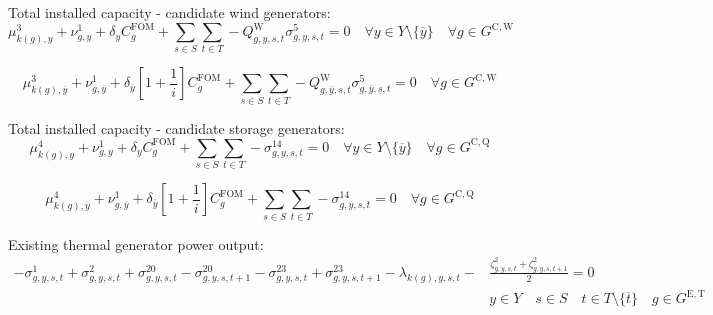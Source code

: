 \documentclass{article}
\newcommand{\sGeneratorsExistingThermal}{G^{\mathrm{E,T}}}
\newcommand{\sGeneratorsCandidateWind}{G^{\mathrm{C,W}}}
\newcommand{\sStorageCandidate}{G^{\mathrm{C,Q}}}
\newcommand{\sYears}{Y}
\newcommand{\sScenarios}{S}
\newcommand{\sIntervals}{T}
\newcommand{\iGenerator}{g}
\newcommand{\iYear}{y}
\newcommand{\iYearTerminal}{\overline{\iYear}}
\newcommand{\iScenario}{s}
\newcommand{\iInterval}{t}
\newcommand{\iIntervalTerminal}{\overline{\iInterval}}
\newcommand{\iZone}{z}
\newcommand{\cFixedOperationsMaintenanceCostGenerator}[1][\iGenerator]{C^{\mathrm{FOM}}_{#1}}
\newcommand{\cInterestRate}{i}
\newcommand{\cCapacityFactorWind}[1][\iGenerator,\iYear,\iScenario,\iInterval]{Q_{#1}^{\mathrm{W}}}
\newcommand{\cDiscountRate}[1][\iYear]{\delta_{#1}}
\newcommand{\dWindBuildLimit}[1][\iZone,\iYear]{\mu_{#1}^{3}}
\newcommand{\dStorageBuildLimit}[1][\iZone,\iYear]{\mu_{#1}^{4}}
\newcommand{\dTotalInstallCapacity}[1][\iGenerator,\iYear]{\nu_{#1}^{1}}
\newcommand{\dMinPowerOutput}[1][\iGenerator,\iYear,\iScenario,\iInterval]{\sigma_{#1}^{1}}
\newcommand{\dMaxPowerOutputExistingThermal}[1][\iGenerator,\iYear,\iScenario,\iInterval]{\sigma_{#1}^{2}}
\newcommand{\dMaxPowerOutputWindCandidate}[1][\iGenerator,\iYear,\iScenario,\iInterval]{\sigma_{#1}^{5}}
\newcommand{\dMaxDischargingRateCandidate}[1][\iGenerator,\iYear,\iScenario,\iInterval]{\sigma_{#1}^{14}}
\newcommand{\dRampRateUp}[1][\iGenerator,\iYear,\iScenario,\iInterval]{\sigma_{#1}^{20}}
\newcommand{\dRampRateDown}[1][\iGenerator,\iYear,\iScenario,\iInterval]{\sigma_{#1}^{23}}
\newcommand{\dPowerBalance}[1][\iZone,\iYear,\iScenario,\iInterval]{\lambda_{#1}}
\newcommand{\dGeneratorEnergyOutput}[1][\iGenerator,\iYear,\iScenario,\iInterval]{\zeta_{#1}^{2}}
\begin{document}
Total installed capacity - candidate wind generators:
\begin{equation}
\dWindBuildLimit[k(\iGenerator), \iYear] + \dTotalInstallCapacity + \cDiscountRate \cFixedOperationsMaintenanceCostGenerator + \sum\limits_{\iScenario \in \sScenarios}\sum\limits_{\iInterval \in \sIntervals} - \cCapacityFactorWind \dMaxPowerOutputWindCandidate = 0 \quad \forall \iYear \in \sYears \setminus \{\iYearTerminal\} \quad \forall \iGenerator \in \sGeneratorsCandidateWind
\end{equation}

\begin{equation}
\dWindBuildLimit[k(\iGenerator),\iYearTerminal] + \dTotalInstallCapacity[\iGenerator,\iYearTerminal] + \cDiscountRate[\iYearTerminal] \left[1 + \frac{1}{\cInterestRate}\right] \cFixedOperationsMaintenanceCostGenerator + \sum\limits_{\iScenario \in \sScenarios}\sum\limits_{\iInterval \in \sIntervals} - \cCapacityFactorWind[\iGenerator,\iYearTerminal,\iScenario,\iInterval] \dMaxPowerOutputWindCandidate[\iGenerator,\iYearTerminal,\iScenario,\iInterval] = 0 \quad \forall \iGenerator \in \sGeneratorsCandidateWind
\end{equation}

Total installed capacity - candidate storage generators:
\begin{equation}
\dStorageBuildLimit[k(\iGenerator), \iYear] + \dTotalInstallCapacity + \cDiscountRate \cFixedOperationsMaintenanceCostGenerator + \sum\limits_{\iScenario \in \sScenarios}\sum\limits_{\iInterval \in \sIntervals} - \dMaxDischargingRateCandidate = 0 \quad \forall \iYear \in \sYears \setminus \{\iYearTerminal\} \quad \forall \iGenerator \in \sStorageCandidate
\end{equation}


\begin{equation}
\dStorageBuildLimit[k(\iGenerator),\iYearTerminal] + \dTotalInstallCapacity[\iGenerator,\iYearTerminal] + \cDiscountRate[\iYearTerminal] \left[1 + \frac{1}{\cInterestRate}\right] \cFixedOperationsMaintenanceCostGenerator + \sum\limits_{\iScenario \in \sScenarios}\sum\limits_{\iInterval \in \sIntervals} - \dMaxDischargingRateCandidate[\iGenerator,\iYearTerminal,\iScenario,\iInterval] = 0 \quad \forall \iGenerator \in \sStorageCandidate
\end{equation}

Existing thermal generator power output:
\begin{align}
-\dMinPowerOutput + \dMaxPowerOutputExistingThermal + \dRampRateUp - \dRampRateUp[\iGenerator,\iYear,\iScenario,\iInterval+1] - \dRampRateDown + \dRampRateDown[\iGenerator,\iYear,\iScenario,\iInterval+1] - \dPowerBalance[k(\iGenerator),\iYear,\iScenario,\iInterval] - & \frac{\dGeneratorEnergyOutput + \dGeneratorEnergyOutput[\iGenerator,\iYear,\iScenario,\iInterval+1]}{2} = 0\\\nonumber
& \iYear \in \sYears \quad \iScenario \in \sScenarios \quad \iInterval \in \sIntervals \setminus \{\iIntervalTerminal\} \quad \iGenerator \in \sGeneratorsExistingThermal\\\nonumber
\end{align}
\end{document}
